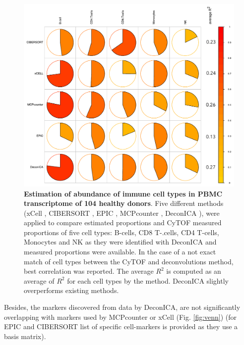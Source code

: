 \documentclass[12pt,]{book}
\theoremstyle{definition}
\theoremstyle{definition}
\theoremstyle{definition}
\theoremstyle{remark}
\begin{document}
\begin{figure}

{\centering \includegraphics[width=0.7\linewidth]{figures-ext/comparisonR2} 

}

\caption[Estimation of abundance of immune cell types in PBMC transcriptome of 104 healthy donors]{\textbf{Estimation of abundance of immune cell
types in PBMC transcriptome of 104 healthy donors}. Five different
methods (xCell \citep{Aran2017}, CIBERSORT \citep{Newman2015}, EPIC
\citep{Racle2017}, MCPcounter \citep{Becht2016}, DeconICA
\citep{Czerwinska2018}), were applied to compare estimated proportions
and CyTOF measured proportions of five cell types: B-cells, CD8
T-.cells, CD4 T-cells, Monocytes and NK as they were identified with
DeconICA and measured proportions were available. In the case of a not
exact match of cell types between the CyTOF and deconvolutions method,
best correlation was reported. The average \(R^2\) is computed as an
average of \(R^2\) for each cell types by the method. DeconICA slightly
overperforms existing methods.}\label{fig:comparison}
\end{figure}














Besides, the markers discovered from data by DeconICA, are not
significantly overlapping with markers used by MCPcounter or xCell (Fig.
\ref{fig:venn}) (for EPIC and CIBERSORT list of specific cell-markers is
provided as they use a basis matrix).
\end{document}
